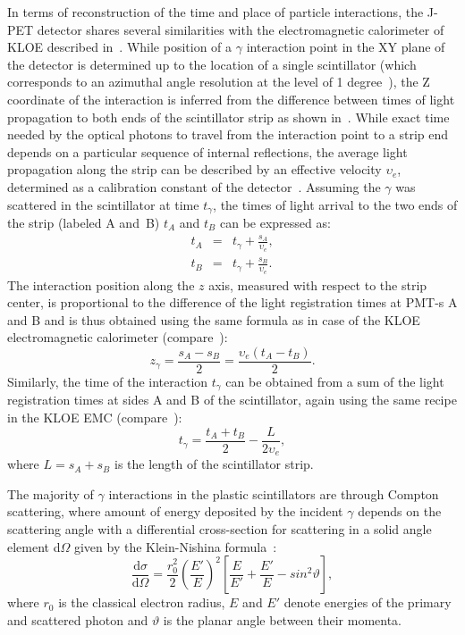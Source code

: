 In terms of reconstruction of the time and place of particle interactions, the J-PET detector shares several similarities with the electromagnetic calorimeter of KLOE described in~. While position of a $\gamma$ interaction point in the XY plane of the detector is determined up to the location of a single scintillator (which corresponds to an azimuthal angle resolution at the level of 1 degree~\cite{gajos_gps}), the Z coordinate of the interaction is inferred from the difference between times of light propagation to both ends of the scintillator strip as shown in~. While exact time needed by the optical photons to travel from the interaction point to a strip end depends on a particular sequence of internal reflections, the average light propagation along the strip can be described by an effective velocity $\upsilon_{e}$, determined as a calibration constant of the detector~\cite{jpet_single_module}. Assuming the $\gamma$ was scattered in the scintillator at time $t_{\gamma}$, the times of light arrival to the two ends of the strip (labeled A and~B) $t_A$ and $t_B$ can be expressed as:
\begin{eqnarray}
  \label{eq:jpet_zpos}
  t_A &=& t_{\gamma} + \frac{s_A}{\upsilon_{e}},\\
  t_B &=& t_{\gamma} + \frac{s_B}{\upsilon_{e}}.
\end{eqnarray}
The interaction position along the $z$ axis, measured with respect to the strip center, is proportional to the difference of the light registration times at PMT-s A and B and is thus obtained using the same formula as in case of the KLOE electromagnetic calorimeter (compare~):
\begin{equation}
  \label{eq:jpet_zpos2}
  z_{\gamma} = \frac{s_A - s_B}{2} = \frac{\upsilon_{e}\left( t_A - t_B \right)}{2}.
\end{equation}
Similarly, the time of the interaction $t_{\gamma}$ can be obtained from a sum of the light registration times at sides A and B of the scintillator, again using the same recipe in the KLOE EMC (compare~):
\begin{equation}
  \label{eq:jpet_hittime}
  t_{\gamma} = \frac{t_A + t_B}{2}  - \frac{L}{2\upsilon_{e}},
\end{equation}
where $L=s_A+s_B$ is the length of the scintillator strip.

The majority of $\gamma$ interactions in the plastic scintillators are through Compton scattering, where amount of energy deposited by the incident $\gamma$ depends on the scattering angle with a differential cross-section for scattering in a solid angle element d$\Omega$ given by the Klein-Nishina formula~\cite{Griffiths}:
\begin{equation}
  \label{eq:klein_nishina}
  \frac{\text{d}\sigma}{\text{d}\Omega} = \frac{r_0^2}{2}\left(\frac{E'}{E}\right)^2\left[ \frac{E}{E'} + \frac{E'}{E} - sin^2\vartheta \right],
\end{equation}
where $r_0$ is the classical electron radius, $E$ and $E'$ denote energies of the primary and scattered photon and $\vartheta$ is the planar angle between their momenta.

